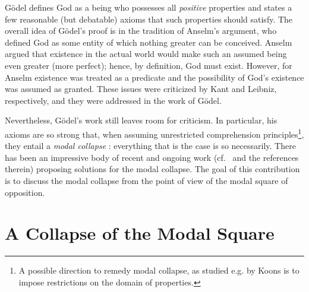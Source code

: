 \documentclass{birkmult}
\theoremstyle{definition}
\theoremstyle{remark}
\numberwithin{equation}{section}
\begin{document}
G\"{o}del defines God as a being who possesses all \emph{positive}
properties and states a few reasonable (but debatable) axioms that
such properties should satisfy.  
The overall idea of G{\"o}del's proof
is in the tradition of Anselm's argument, who defined God as some
entity of which nothing greater can be conceived. 
Anselm argued that
existence in the actual world would make 
such an assumed being even
greater (more perfect); 
hence, by definition, God must exist. However,
for Anselm existence was treated as a predicate and 
the possibility of God's existence was assumed as granted. 
These issues were criticized by Kant and Leibniz, 
respectively, and they were addressed in the work of G\"odel.

Nevertheless, G{\"o}del's work still leaves room for criticism.  In
particular, his axioms are so strong that, when assuming unrestricted
comprehension principles\footnote{A possible direction to remedy modal
  collapse, as studied e.g. by Koons
  \cite{koons06:_sobel_goedel_ontol_proof} is to impose restrictions
  on the domain of properties.}, 
they entail a \emph{modal collapse}
\cite{Sobel1987,sobel2004logic}: everything that is the case is so
necessarily.  There has been an impressive body of recent and ongoing
work
(cf.~\cite{sobel2004logic,Fitting,anderson90:_some_emend_of_goedel_ontol_proof,AndersonGettings,bjordal99,fuhrmann05:_exist_notwen,Hajek2002,Hajek2008,ContemporaryBibliography}
and the references therein) proposing solutions for the modal
collapse.  The goal of this contribution is to discuss the modal
collapse from the point of view of the modal square of opposition.


\section{A Collapse of the Modal Square}
\end{document}
